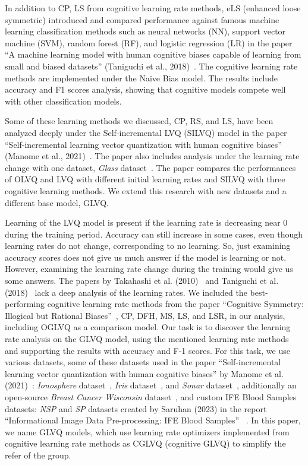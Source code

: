 In addition to CP, LS from cognitive learning rate methods, eLS (enhanced loose symmetric) introduced and compared performance against famous machine learning classification methods such as neural networks (NN), support vector machine (SVM), random forest (RF), and logistic regression (LR) in the paper “A machine learning model with human cognitive biases capable of learning from small and biased datasets” (Taniguchi et al., 2018)~\cite{els}. The cognitive learning rate methods are implemented under the Naïve Bias model. The results include accuracy and F1 scores analysis, showing that cognitive models compete well with other classification models.

Some of these learning methods we discussed, CP, RS, and LS, have been analyzed deeply under the Self-incremental LVQ (SILVQ) model in the paper “Self-incremental learning vector quantization with human cognitive biases” (Manome et al., 2021)~\cite{lrimp}. The paper also includes analysis under the learning rate change with one dataset, \textit{Glass} dataset~\cite{glass,lrimp}. The paper compares the performances of OLVQ and LVQ with different initial learning rates and SILVQ with three cognitive learning methods. We extend this research with new datasets and a different base model, GLVQ.

Learning of the LVQ model is present if the learning rate is decreasing near 0 during the training period. Accuracy can still increase in some cases, even though learning rates do not change, corresponding to no learning. So, just examining accuracy scores does not give us much answer if the model is learning or not. However, examining the learning rate change during the training would give us some answers. The papers by Takahashi et al. (2010)~\cite{cogn} and Taniguchi et al. (2018)~\cite{els} lack a deep analysis of the learning rates. We included the best-performing cognitive learning rate methods from the paper “Cognitive Symmetry: Illogical but Rational Biases”~\cite{cogn}, CP, DFH, MS, LS, and LSR, in our analysis, including OGLVQ as a comparison model. Our task is to discover the learning rate analysis on the GLVQ model, using the mentioned learning rate methods and supporting the results with accuracy and F-1 scores. For this task, we use various datasets, some of these datasets used in the paper “Self-incremental learning vector quantization with human cognitive biases” by Manome et al. (2021)~\cite{lrimp}: \textit{Ionosphere} dataset~\cite{ion}, \textit{Iris} dataset~\cite{iris}, and \textit{Sonar} dataset~\cite{sonar}, additionally an open-source \textit{Breast Cancer Wisconsin} dataset~\cite{cancer}, and custom IFE Blood Samples datasets: \textit{NSP} and \textit{SP} datasets created by Saruhan (2023) in the report “Informational Image Data Pre-processing: IFE Blood Samples” ~\cite{mypap}. In this paper, we name GLVQ models, which use learning rate optimizers implemented from cognitive learning rate methods as CGLVQ (cognitive GLVQ) to simplify the refer of the group.
